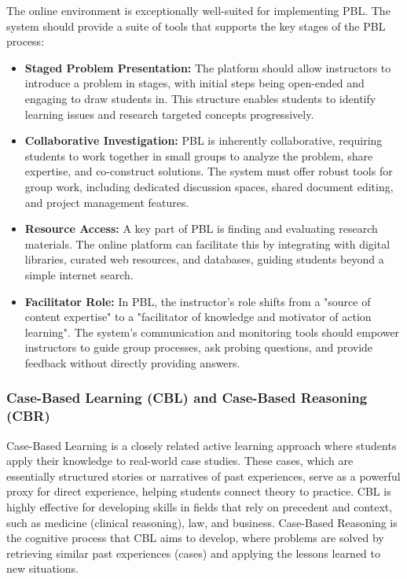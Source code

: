 \documentclass{article}
\begin{document}
The online environment is exceptionally well-suited for implementing PBL. The system should provide a suite of tools that supports the key stages of the PBL process:
\begin{itemize}
    \item \textbf{Staged Problem Presentation:} The platform should allow instructors to introduce a problem in stages, with initial steps being open-ended and engaging to draw students in.\cite{49} This structure enables students to identify learning issues and research targeted concepts progressively.
    \item \textbf{Collaborative Investigation:} PBL is inherently collaborative, requiring students to work together in small groups to analyze the problem, share expertise, and co-construct solutions.\cite{50, 52} The system must offer robust tools for group work, including dedicated discussion spaces, shared document editing, and project management features.\cite{51}
    \item \textbf{Resource Access:} A key part of PBL is finding and evaluating research materials.\cite{49} The online platform can facilitate this by integrating with digital libraries, curated web resources, and databases, guiding students beyond a simple internet search.\cite{49}
    \item \textbf{Facilitator Role:} In PBL, the instructor's role shifts from a "source of content expertise" to a "facilitator of knowledge and motivator of action learning".\cite{51} The system's communication and monitoring tools should empower instructors to guide group processes, ask probing questions, and provide feedback without directly providing answers.
\end{itemize}

\subsubsection{Case-Based Learning (CBL) and Case-Based Reasoning (CBR)}

Case-Based Learning is a closely related active learning approach where students apply their knowledge to real-world case studies.\cite{53} These cases, which are essentially structured stories or narratives of past experiences, serve as a powerful proxy for direct experience, helping students connect theory to practice.\cite{54, 55} CBL is highly effective for developing skills in fields that rely on precedent and context, such as medicine (clinical reasoning), law, and business.\cite{53, 54, 56} Case-Based Reasoning is the cognitive process that CBL aims to develop, where problems are solved by retrieving similar past experiences (cases) and applying the lessons learned to new situations.\cite{55}
\end{document}
